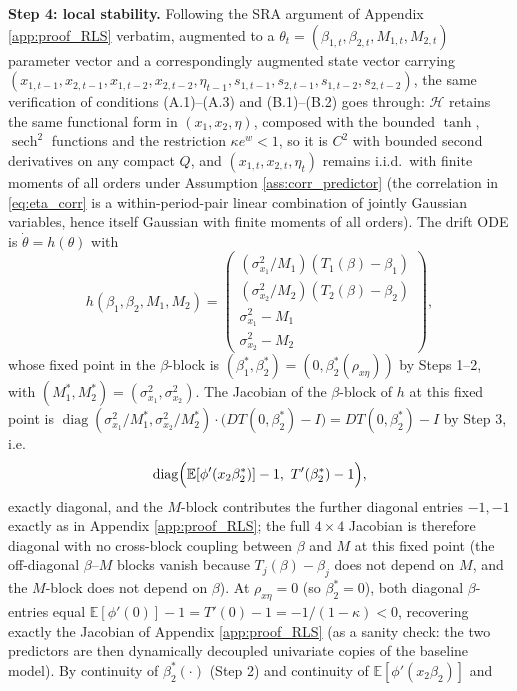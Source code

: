 \textbf{Step 4: local stability.} Following the SRA argument of Appendix \ref{app:proof_RLS} verbatim,
augmented to a $\theta_t=(\beta_{1,t},\beta_{2,t},M_{1,t},M_{2,t})$ parameter vector and a correspondingly
augmented state vector carrying $(x_{1,t-1},x_{2,t-1},x_{1,t-2},x_{2,t-2},\eta_{t-1},s_{1,t-1},s_{2,t-1},
s_{1,t-2},s_{2,t-2})$, the same verification of conditions (A.1)--(A.3) and (B.1)--(B.2) goes through:
$\mathcal H$ retains the same functional form in $(x_1,x_2,\eta)$, composed with the bounded $\tanh$,
$\operatorname{sech}^2$ functions and the restriction $\kappa e^w<1$, so it is $C^2$ with bounded second
derivatives on any compact $Q$, and $(x_{1,t},x_{2,t},\eta_t)$ remains i.i.d.\ with finite moments of all
orders under Assumption \ref{ass:corr_predictor} (the correlation in \eqref{eq:eta_corr} is a
within-period-pair linear combination of jointly Gaussian variables, hence itself Gaussian with finite
moments of all orders). The drift ODE is $\dot\theta=h(\theta)$ with
\[
h(\beta_1,\beta_2,M_1,M_2) = \begin{pmatrix} (\sigma_{x_1}^2/M_1)(T_1(\beta)-\beta_1) \\
(\sigma_{x_2}^2/M_2)(T_2(\beta)-\beta_2) \\ \sigma_{x_1}^2-M_1 \\ \sigma_{x_2}^2-M_2 \end{pmatrix},
\]
whose fixed point in the $\beta$-block is $(\beta_1^*,\beta_2^*)=(0,\beta_2^*(\rho_{x\eta}))$ by Steps 1--2,
with $(M_1^*,M_2^*)=(\sigma_{x_1}^2,\sigma_{x_2}^2)$. The Jacobian of the $\beta$-block of $h$ at this
fixed point is $\operatorname{diag}(\sigma_{x_1}^2/M_1^*,\sigma_{x_2}^2/M_2^*)\cdot\bigl(DT(0,\beta_2^*)-I\bigr)
=DT(0,\beta_2^*)-I$ by Step 3, i.e.
\[
\operatorname{diag}\Bigl(\mathbb E[\phi'(x_2\beta_2^*)]-1,\ T'(\beta_2^*)-1\Bigr),
\]
exactly diagonal, and the $M$-block contributes the further diagonal entries $-1,-1$ exactly as in
Appendix \ref{app:proof_RLS}; the full $4\times4$ Jacobian is therefore diagonal with no
cross-block coupling between $\beta$ and $M$ at this fixed point (the off-diagonal $\beta$--$M$ blocks
vanish because $T_j(\beta)-\beta_j$ does not depend on $M$, and the $M$-block does not depend on
$\beta$). At $\rho_{x\eta}=0$ (so $\beta_2^*=0$), both diagonal $\beta$-entries equal $\mathbb
E[\phi'(0)]-1=T'(0)-1=-1/(1-\kappa)<0$, recovering exactly the Jacobian of Appendix \ref{app:proof_RLS}
(as a sanity check: the two predictors are then dynamically decoupled univariate copies of the baseline
model). By continuity of $\beta_2^*(\cdot)$ (Step 2) and continuity of $\mathbb E[\phi'(x_2\beta_2)]$ and
